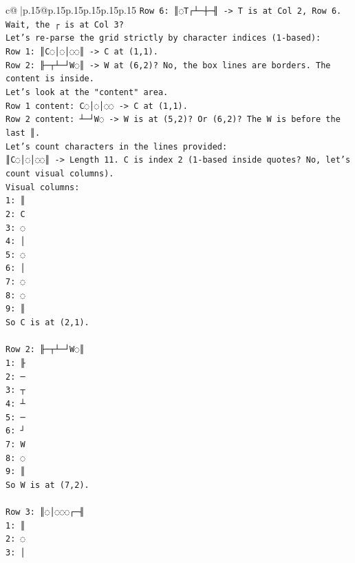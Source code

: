 \documentclass{article}
\begin{document}
{\begin{supertabular}{c@{$\;$}|p{.15\linewidth}@{}p{.15\linewidth}p{.15\linewidth}p{.15\linewidth}p{.15\linewidth}p{.15\linewidth}}
{{{\texttt{Row 6: ║◌T┌┴─┼─╢ {-}> T is at Col 2, Row 6. Wait, the ┌ is at Col 3?} \\
\texttt{Let's re{-}parse the grid strictly by character indices (1{-}based):} \\
\texttt{Row 1: ║C◌│◌│◌◌║ {-}> C at (1,1).} \\
\texttt{Row 2: ╟─┬┴─┘W◌║ {-}> W at (6,2)? No, the box lines are borders. The content is inside.} \\
\texttt{Let's look at the "content" area.} \\
\texttt{Row 1 content: C◌│◌│◌◌ {-}> C at (1,1).} \\
\texttt{Row 2 content: ┴─┘W◌ {-}> W is at (5,2)? Or (6,2)? The W is before the last ║.} \\
\texttt{Let's count characters in the lines provided:} \\
\texttt{║C◌│◌│◌◌║ {-}> Length 11. C is index 2 (1{-}based inside quotes? No, let's count visual columns).} \\
\texttt{Visual columns:} \\
\texttt{1: ║} \\
\texttt{2: C} \\
\texttt{3: ◌} \\
\texttt{4: │} \\
\texttt{5: ◌} \\
\texttt{6: │} \\
\texttt{7: ◌} \\
\texttt{8: ◌} \\
\texttt{9: ║} \\
\texttt{So C is at (2,1).} \\
\\ 
\texttt{Row 2: ╟─┬┴─┘W◌║} \\
\texttt{1: ╟} \\
\texttt{2: ─} \\
\texttt{3: ┬} \\
\texttt{4: ┴} \\
\texttt{5: ─} \\
\texttt{6: ┘} \\
\texttt{7: W} \\
\texttt{8: ◌} \\
\texttt{9: ║} \\
\texttt{So W is at (7,2).} \\
\\ 
\texttt{Row 3: ║◌│◌◌◌┌─╢} \\
\texttt{1: ║} \\
\texttt{2: ◌} \\
\texttt{3: │} \\
}}}
\end{supertabular}}
\end{document}

